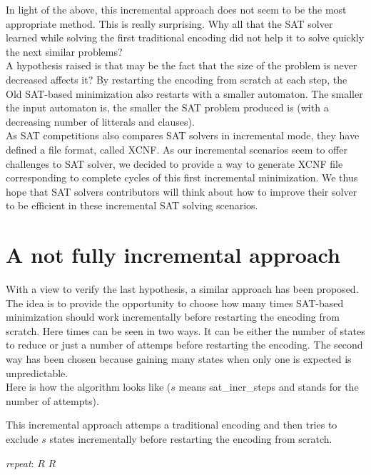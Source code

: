 \noindent In light of the above, this incremental approach does not seem to be the most appropriate method.
This is really surprising. Why all that the SAT solver learned while solving the first traditional encoding
did not help it to solve quickly the next similar problems?\\

A hypothesis raised is that may be the fact that the size of the problem is never decreased affects it? By
restarting the encoding from scratch at each step, the Old SAT-based minimization also restarts with a
smaller automaton. The smaller the input automaton is, the smaller the SAT problem produced is (with a
decreasing number of litterals and clauses).\\

As SAT competitions also compares SAT solvers in incremental mode, they have defined a file format,
called XCNF. As our incremental scenarios seem to offer challenges to SAT solver, we decided to provide
a way to generate XCNF file corresponding to complete cycles of this first incremental minimization. We thus
hope that SAT solvers contributors will think about how to improve their solver to be efficient in
these incremental SAT solving scenarios.

\section{A not fully incremental approach}
\label{approach2}
With a view to verify the last hypothesis, a similar approach has been proposed.
The idea is to provide the opportunity to choose how many times SAT-based
minimization should work incrementally before restarting the encoding from scratch. Here times can be seen
in two ways. It can be either the number of states to reduce or just a number of attemps before
restarting the encoding. The second way has been chosen because gaining many states when only one is
expected is unpredictable.\\

Here is how the algorithm looks like ($s$ means sat\_incr\_steps and stands for the number of attempts).

\begin{algorithm}[H]
 \caption{This incremental approach attemps a traditional encoding and then tries to exclude
          $s$ states incrementally before restarting the encoding from scratch.}
 \label{incr2}
 \begin{algorithmic}[1]
   \BState \emph{repeat}:
    \Return $R$\EndIf
     \Return $R$\EndIf
   \EndFor
  \EndProcedure
 \end{algorithmic}
\end{algorithm}

